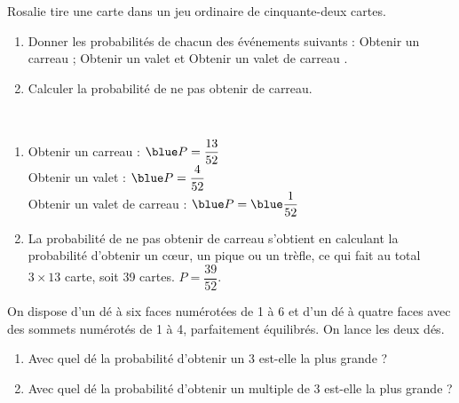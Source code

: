 \begin{colonne*exercice}
\begin{exercice} %
   Rosalie tire une carte dans un jeu ordinaire de cinquante-deux cartes.
   \begin{enumerate}
      \item Donner les probabilités de chacun des événements suivants : \og Obtenir un carreau \fg ; \og Obtenir un valet \fg{} et \og Obtenir un valet de carreau \fg.
      \item Calculer la probabilité de ne pas obtenir de carreau.
   \end{enumerate}
\end{exercice}

\begin{corrige}
   \ \\ [-5mm]
   \begin{enumerate}
      \item Obtenir un carreau : ${\blue P =\dfrac{13}{52}}$ \\ [1mm]
         Obtenir un valet : ${\blue P =\dfrac{4}{52}}$ \\
         Obtenir un valet de carreau  : ${\blue P =\blue \dfrac{1}{52}}$ \smallskip
      \item La probabilité de ne pas obtenir de carreau s'obtient en calculant la probabilité d'obtenir un c\oe ur, un pique ou un trèfle, ce qui fait au total $3\times13$ carte, soit 39 cartes. {\blue $P =\dfrac{39}{52}$}.
   \end{enumerate}      
\end{corrige}

\medskip


\begin{exercice} %
   On dispose d’un dé à six faces numérotées de 1 à 6 et d’un dé à quatre faces avec des sommets numérotés de 1 à 4, parfaitement équilibrés. On lance les deux dés.
   \begin{enumerate}
      \item Avec quel dé la probabilité d’obtenir un 3 est-elle la plus
grande ?
      \item Avec quel dé la probabilité d’obtenir un multiple de 3 est-elle la plus grande ?
   \end{enumerate}
\end{exercice}


\end{colonne*exercice}
